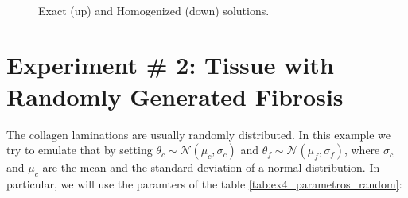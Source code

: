 \documentclass[letterpaper]{article} 			     	%
\begin{document}
\begin{figure}[H]
\centering
{} \\
\caption{Exact (up) and Homogenized (down) solutions.} \label{fig:results_exp2}
\end{figure}


\section{Experiment \# 2: Tissue with Randomly Generated Fibrosis}

The collagen laminations are usually randomly distributed. In this example we try to emulate that by setting $\theta_c  \sim \mathcal{N}(\mu_c, \sigma_c)$ and $\theta_f \sim \mathcal{N}(\mu_f, \sigma_f)$, where $\sigma_c$ and $\mu_c$ are the mean and the standard deviation of a normal distribution. In particular, we will use the paramters of the table \ref{tab:ex4_parametros_random}:
\end{document}
